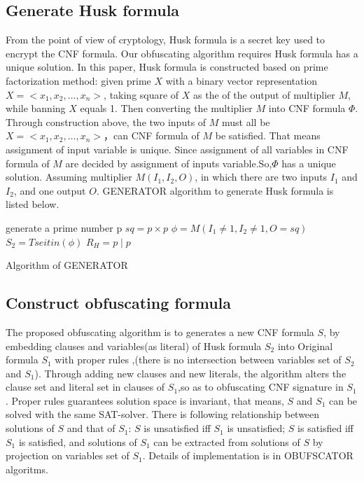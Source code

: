 \documentclass[runningheads,a4paper]{llncs}
\begin{document}
\subsection{Generate Husk formula}
From the point of view of cryptology, Husk formula is a secret key used to encrypt the CNF formula. 
Our obfuscating algorithm requires Husk formula has a unique solution.
In this paper, Husk formula is constructed based on prime factorization method:
given prime $X$ with a binary vector representation $X = <x_1,x_2,\dots,x_n>$, 
taking square of $X$ as the of the output of multiplier $M$, while banning $X$ equals 1.
Then converting the multiplier $M$ into CNF formula $\Phi$.
Through construction above, the two inputs of $M$ must all be $X = <x_1,x_2,\dots,x_n>$，can CNF formula of $M$ be satisfied.
That means assignment of input variable is unique.
Since assignment of all variables in CNF formula of $M$ are decided by assignment of inputs variable.So,$\Phi$ has a unique solution. 
Assuming multiplier $M (I_1, I_2, O)$, in which there are two inputs $I_1$ and $I_2$, and one output $O$.
GENERATOR algorithm to generate Husk formula is listed below.

\begin{algorithm}[H]
\SetAlgoLined
{}
generate a prime number p \;
$sq=p\times p$ \;
$\phi= M(I_1 \neq 1, I_2\neq 1, O=sq)$ \;
$S_2=Tseitin(\phi)$ \;
$R_H=p\mid p$ \;
\caption{Algorithm of GENERATOR}
\end{algorithm}




\subsection{Construct obfuscating formula}

The proposed obfuscating algorithm is to generates a new CNF formula $S$, 
by embedding clauses and variables(as literal) of Husk formula $S_2$ into Original formula $S_1$ with proper rules ,(there is no intersection between variables set of $S_2$ and $S_1$). 
Through adding new clauses and new literals, the algorithm alters the clause set and literal set in clauses of $S_1$,so as to obfuscating CNF signature in $S_1$.
Proper rules guarantees solution space is invariant, that means, $S$ and $S_1$ can be solved with the same SAT-solver.
There is following relationship between solutions of $S$ and that of $S_1$: $S$ is unsatisfied iff $S_1$ is unsatisfied;
$S$ is satisfied iff $S_1$ is satisfied, and solutions of $S_1$ can be extracted from solutions of $S$ by projection on variables set of $S_1$.
Details of implementation is in OBUFSCATOR algoritms.
\end{document}
